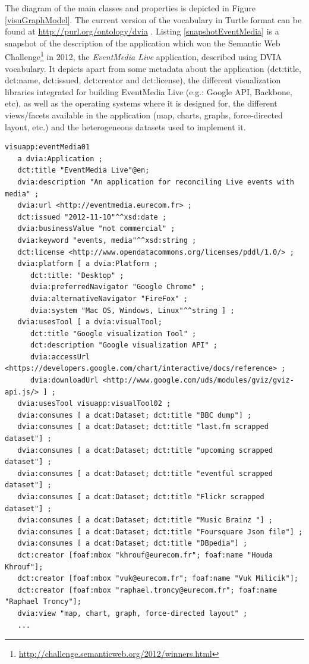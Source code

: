 The diagram of the main classes and properties is depicted in Figure \ref{visuGraphModel}. The current version of the vocabulary in Turtle format can be found at \url{http://purl.org/ontology/dvia} .  Listing \ref{snapshotEventMedia} is a snapshot of the description of the application which won the Semantic Web Challenge\footnote{\url{http://challenge.semanticweb.org/2012/winners.html}} in 2012, the \textit{EventMedia Live} application, described using DVIA vocabulary. It depicts apart from some metadata about the application (dct:title, dct:name, dct:issued, dct:creator and dct:license), the different visualization libraries integrated for building EventMedia Live (e.g.: Google API, Backbone, etc), as well as the operating systems where it is designed for, the different views/facets available in the application (map, charts, graphs, force-directed layout, etc.) and the heterogeneous datasets used to implement it.

\begin{lstlisting}
visuapp:eventMedia01
   a dvia:Application ;
   dct:title "EventMedia Live"@en;
   dvia:description "An application for reconciling Live events with media" ;
   dvia:url <http://eventmedia.eurecom.fr> ;
   dct:issued "2012-11-10"^^xsd:date ;
   dvia:businessValue "not commercial" ;
   dvia:keyword "events, media"^^xsd:string ;
   dct:license <http://www.opendatacommons.org/licenses/pddl/1.0/> ;
   dvia:platform [ a dvia:Platform ;
      dct:title: "Desktop" ;
	  dvia:preferredNavigator "Google Chrome" ;
	  dvia:alternativeNavigator "FireFox" ;
	  dvia:system "Mac OS, Windows, Linux"^^string ] ;	
   dvia:usesTool [ a dvia:visualTool; 
      dct:title "Google visualization Tool" ;
	  dct:description "Google visualization API" ;
	  dvia:accessUrl <https://developers.google.com/chart/interactive/docs/reference> ;
	  dvia:downloadUrl <http://www.google.com/uds/modules/gviz/gviz-api.js/> ] ;
   dvia:usesTool visuapp:visualTool02 ;
   dvia:consumes [ a dcat:Dataset; dct:title "BBC dump"] ;
   dvia:consumes [ a dcat:Dataset; dct:title "last.fm scrapped dataset"] ;
   dvia:consumes [ a dcat:Dataset; dct:title "upcoming scrapped dataset"] ;
   dvia:consumes [ a dcat:Dataset; dct:title "eventful scrapped dataset"] ;
   dvia:consumes [ a dcat:Dataset; dct:title "Flickr scrapped dataset"] ;
   dvia:consumes [ a dcat:Dataset; dct:title "Music Brainz "] ;
   dvia:consumes [ a dcat:Dataset; dct:title "Foursquare Json file"] ;
   dvia:consumes [ a dcat:Dataset; dct:title "DBpedia"] ;
   dct:creator [foaf:mbox "khrouf@eurecom.fr"; foaf:name "Houda Khrouf"];
   dct:creator [foaf:mbox "vuk@eurecom.fr"; foaf:name "Vuk Milicik"];
   dct:creator [foaf:mbox "raphael.troncy@eurecom.fr"; foaf:name "Raphael Troncy"];
   dvia:view "map, chart, graph, force-directed layout" ;
   ...
\end{lstlisting}

